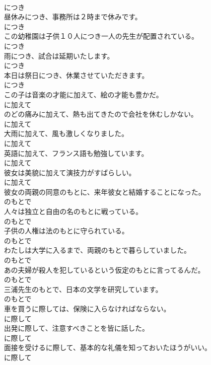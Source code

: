 \documentclass[8pt]{extreport}
\begin{document}
\begin{CJK}{UTF8}{min}
\\	につき
\\	昼休みにつき、事務所は２時まで休みです。	
\\	につき
\\	この幼稚園は子供１０人につき一人の先生が配置されている。	
\\	につき
\\	雨につき、試合は延期いたします。	
\\	につき
\\	本日は祭日につき、休業させていただきます。	
\\	につき
\\	この子は音楽の才能に加えて、絵の才能も豊かだ。	
\\	に加えて
\\	のどの痛みに加えて、熱も出てきたので会社を休むしかない。	
\\	に加えて
\\	大雨に加えて、風も激しくなりました。	
\\	に加えて
\\	英語に加えて、フランス語も勉強しています。	
\\	に加えて
\\	彼女は美貌に加えて演技力がすばらしい。	
\\	に加えて
\\	彼女の両親の同意のもとに、来年彼女と結婚することになった。	
\\	のもとで
\\	人々は独立と自由の名のもとに戦っている。	
\\	のもとで
\\	子供の人権は法のもとに守られている。	
\\	のもとで
\\	わたしは大学に入るまで、両親のもとで暮らしていました。	
\\	のもとで
\\	あの夫婦が殺人を犯しているという仮定のもとに言ってるんだ。	
\\	のもとで
\\	三浦先生のもとで、日本の文学を研究しています。	
\\	のもとで
\\	車を買うに際しては、保険に入らなければならない。	
\\	に際して
\\	出発に際して、注意すべきことを皆に話した。	
\\	に際して
\\	面接を受けるに際して、基本的な礼儀を知っておいたほうがいい。	
\\	に際して

\end{CJK}
\end{document}
